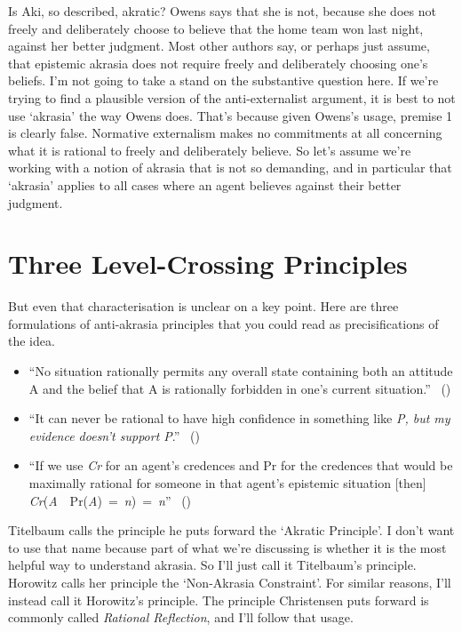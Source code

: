 \documentclass[
  10pt,
  letterpaper,
  twoside]{scrbook}
\providecommand{\tightlist}{%
  \setlength{\itemsep}{0pt}\setlength{\parskip}{0pt}}\usepackage{longtable,booktabs,array}
\begin{document}
Is {Aki}, so described, akratic? Owens says that she is not, because she
does not freely and deliberately choose to believe that the home team
won last night, against her better judgment. Most other authors say, or
perhaps just assume, that epistemic akrasia does not require freely and
deliberately choosing one's beliefs. I'm not going to take a stand on
the substantive question here. If we're trying to find a plausible
version of the anti-externalist argument, it is best to not use
`akrasia' the way Owens does. That's because given Owens's usage,
premise 1 is clearly false. Normative externalism makes no commitments
at all concerning what it is rational to freely and deliberately
believe. So let's assume we're working with a notion of akrasia that is
not so demanding, and in particular that `akrasia' applies to all cases
where an agent believes against their better judgment.

\section{Three Level-Crossing
Principles}\label{threelevel-crossingprinciples}

But even that characterisation is unclear on a key point. Here are three
formulations of anti-akrasia principles that you could read as
precisifications of the idea.

\begin{itemize}
\tightlist
\item
  ``No situation rationally permits any overall state containing both an
  attitude A and the belief that A is rationally forbidden in one's
  current situation.'' ~()
\item
  ``It can never be rational to have high confidence in something like
  \emph{P, but my evidence doesn't support P}.''
  ~()
\item
  ``If we use \emph{Cr} for an agent's credences and Pr for the
  credences that would be maximally rational for someone in that agent's
  epistemic situation {[}then{]}
  \emph{Cr}(\emph{A}~\textbar~Pr(\emph{A})~=~\emph{n})~=~\emph{n}''
  ~()
\end{itemize}

Titelbaum calls the principle he puts forward the `Akratic Principle'. I
don't want to use that name because part of what we're discussing is
whether it is the most helpful way to understand akrasia. So I'll just
call it Titelbaum's principle. Horowitz calls her principle the
`Non-Akrasia Constraint'. For similar reasons, I'll instead call it
Horowitz's principle. The principle Christensen puts forward is commonly
called \emph{Rational Reflection}, and I'll follow that usage.
\end{document}
